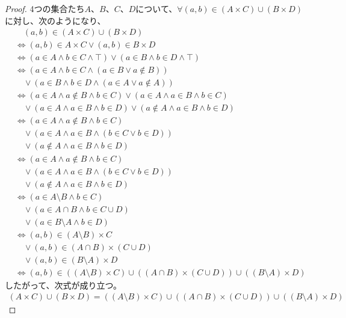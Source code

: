 \documentclass[a4paper]{jsarticle}
\begin{document}
\begin{proof}
4つの集合たち$A$、$B$、$C$、$D$について、$\forall(a,b) \in (A \times C) \cup (B \times D)$に対し、次のようになり、
\begin{align*}
&\quad (a,b) \in (A \times C) \cup (B \times D)\\
&\Leftrightarrow (a,b) \in A \times C \vee (a,b) \in B \times D\\
&\Leftrightarrow (a \in A \land b \in C \land \top) \vee (a \in B \land b \in D \land \top)\\
&\Leftrightarrow \left( a \in A \land b \in C \land (a \in B \vee a \notin B) \right) \\
&\quad \vee \left( a \in B \land b \in D \land (a \in A \vee a \notin A) \right)\\
&\Leftrightarrow (a \in A \land a \notin B \land b \in C) \vee (a \in A \land a \in B \land b \in C) \\
&\quad \vee (a \in A \land a \in B \land b \in D) \vee (a \notin A \land a \in B \land b \in D)\\
&\Leftrightarrow (a \in A \land a \notin B \land b \in C) \\ 
&\quad \vee \left( a \in A \land a \in B \land (b \in C \vee b \in D) \right) \\
&\quad \vee (a \notin A \land a \in B \land b \in D)\\
&\Leftrightarrow (a \in A \land a \notin B \land b \in C) \\
&\quad \vee \left( a \in A \land a \in B \land (b \in C \vee b \in D) \right) \\
&\quad \vee (a \notin A \land a \in B \land b \in D) \\
&\Leftrightarrow (a \in A \setminus B \land b \in C) \\
&\quad \vee (a \in A \cap B \land b \in C \cup D) \\
&\quad \vee (a \in B \setminus A \land b \in D)\\
&\Leftrightarrow (a,b) \in (A \setminus B) \times C \\
&\quad \vee (a,b) \in (A \cap B) \times (C \cup D) \\
&\quad \vee (a,b) \in (B \setminus A) \times D\\
&\Leftrightarrow (a,b) \in \left( (A \setminus B) \times C \right) \cup \left( (A \cap B) \times (C \cup D) \right) \cup \left( (B \setminus A) \times D \right)
\end{align*}
したがって、次式が成り立つ。
\begin{align*}
(A \times C) \cup (B \times D) = \left( (A \setminus B) \times C \right) \cup \left( (A \cap B) \times (C \cup D) \right) \cup \left( (B \setminus A) \times D \right)

\end{align*}
\end{proof}
\end{document}
